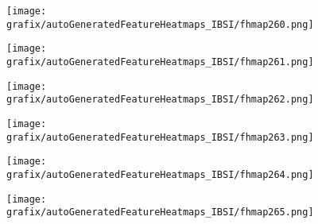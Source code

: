 \hspace{\hsp} 
\begin{subfigure}{\wid\textwidth} 
    \centering 
    \caption{\tiny \sffamily {}} 
    \vspace{\vsp} 
    \texttt{[image: grafix/autoGeneratedFeatureHeatmaps\_IBSI/fhmap260.png]} 
\end{subfigure} 
\hspace{\hsp} 
\begin{subfigure}{\wid\textwidth} 
    \centering 
    \caption{\tiny \sffamily {}} 
    \vspace{\vsp} 
    \texttt{[image: grafix/autoGeneratedFeatureHeatmaps\_IBSI/fhmap261.png]} 
\end{subfigure} 
\hspace{\hsp} 
\begin{subfigure}{\wid\textwidth} 
    \centering 
    \caption{\tiny \sffamily {}} 
    \vspace{\vsp} 
    \texttt{[image: grafix/autoGeneratedFeatureHeatmaps\_IBSI/fhmap262.png]} 
\end{subfigure} 
\hspace{\hsp} 
\begin{subfigure}{\wid\textwidth} 
    \centering 
    \caption{\tiny \sffamily {}} 
    \vspace{\vsp} 
    \texttt{[image: grafix/autoGeneratedFeatureHeatmaps\_IBSI/fhmap263.png]} 
\end{subfigure} 
\hspace{\hsp} 
\begin{subfigure}{\wid\textwidth} 
    \centering 
    \caption{\tiny \sffamily {}} 
    \vspace{\vsp} 
    \texttt{[image: grafix/autoGeneratedFeatureHeatmaps\_IBSI/fhmap264.png]} 
\end{subfigure} 
\hspace{\hsp} 
\begin{subfigure}{\wid\textwidth} 
    \centering 
    \caption{\tiny \sffamily {}} 
    \vspace{\vsp} 
    \texttt{[image: grafix/autoGeneratedFeatureHeatmaps\_IBSI/fhmap265.png]} 
\end{subfigure} 
\hspace{\hsp} 

